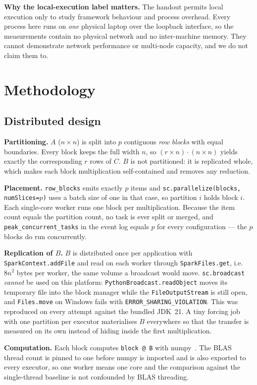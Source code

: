 \documentclass[11pt,a4paper]{article}
\begin{document}
\textbf{Why the local-execution label matters.}
The handout permits local execution only to study framework behaviour
and process overhead. Every process here runs on \emph{one} physical
laptop over the loopback interface, so the measurements contain no
physical network and no inter-machine memory. They cannot demonstrate
network performance or multi-node capacity, and we do not claim them to.

\section{Methodology}

\subsection{Distributed design}

\textbf{Partitioning.}
$A$ ($n \times n$) is split into $p$ contiguous \emph{row blocks} with
equal boundaries. Every block keeps the full width $n$, so
$(r \times n)\cdot(n \times n)$ yields exactly the corresponding $r$
rows of $C$. $B$ is not partitioned: it is replicated whole, which makes
each block multiplication self-contained and removes any reduction.

\textbf{Placement.}
\texttt{row\_blocks} emits exactly $p$ items and
\texttt{sc.parallelize(blocks, numSlices=$p$)} uses a batch size of one
in that case, so partition $i$ holds block $i$. Each single-core worker
runs one block per multiplication. Because the item count equals the
partition count, no task is ever split or merged, and
\texttt{peak\_concurrent\_tasks} in the event log equals $p$ for every
configuration --- the $p$ blocks do run concurrently.

\textbf{Replication of $B$.}
$B$ is distributed once per application with \texttt{SparkContext.addFile}
and read on each worker through \texttt{SparkFiles.get}, i.e.\ $8n^2$
bytes per worker, the same volume a broadcast would move.
\texttt{sc.broadcast} \emph{cannot} be used on this platform:
\texttt{PythonBroadcast.readObject} moves its temporary file into the
block manager while the \texttt{FileOutputStream} is still open, and
\texttt{Files.move} on Windows fails with \texttt{ERROR\_SHARING\_VIOLATION}.
This was reproduced on every attempt against the bundled JDK~21. A tiny
forcing job with one partition per executor materialises $B$ everywhere
so that the transfer is measured on its own instead of hiding inside the
first multiplication.

\textbf{Computation.}
Each block computes \texttt{block @ B} with numpy~\cite{numpy}. The BLAS thread count
is pinned to one before numpy is imported and is also exported to every
executor, so one worker means one core and the comparison against the
single-thread baseline is not confounded by BLAS threading.
\end{document}
